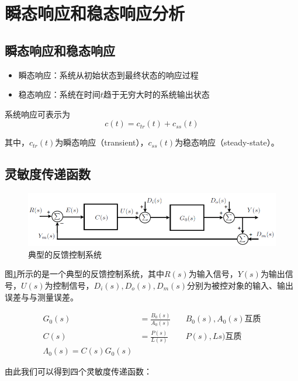 \section{瞬态响应和稳态响应分析}
\subsection{瞬态响应和稳态响应}
\begin{itemize}
	\item	瞬态响应：系统从初始状态到最终状态的响应过程
	\item	稳态响应：系统在时间$t$趋于无穷大时的系统输出状态
\end{itemize}

系统响应可表示为
\begin{equation*}
c(t)=c_{tr}(t)+c_{ss}(t)
\end{equation*}

其中，$c_{tr}(t)$为瞬态响应（transient），$c_{ss}(t)$为稳态响应（steady-state）。

\subsection{灵敏度传递函数}

\begin{figure}[!ht]
	\centering
	\includegraphics[width=\linewidth]{figures/34.png}
	\caption{典型的反馈控制系统}
	\label{34}
\end{figure}

图\ref{34}所示的是一个典型的反馈控制系统，其中$R(s)$为输入信号，$Y(s)$为输出信号，$U(s)$为控制信号，$D_i(s), D_o(s), D_m(s)$分别为被控对象的输入、输出误差与与测量误差。

\begin{align*}
	G_0(s)&=\frac{B_0(s)}{A_0(s)}\quad&\mbox{$B_0(s), A_0(s)$互质}\\
	C(s)&=\frac{P(s)}{L(s)}\quad&\mbox{$P(s), Ls)$互质}\\ 
	\Lambda_0(s)=C(s)G_0(s)
\end{align*}

由此我们可以得到四个灵敏度传递函数：

